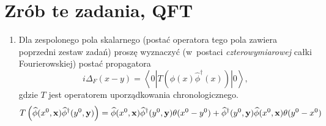 \documentclass[a4paper,11pt]{article}
\begin{document}










\section{Zrób te zadania, QFT}




\begin{enumerate}
\item Dla zespolonego pola skalarnego (postać operatora tego pola
  zawiera poprzedni zestaw zadań) proszę wyznaczyć (w~postaci
  \emph{czterowymiarowej} całki Fourierowskiej) postać propagatora
  \begin{equation}
    \label{eq:6}
    i \Delta_{ F }( x - y )
    =
    \left\langle 0 \left| T\left( \widehat{\phi}( x ) \widehat{\phi}^{ \dagger }( x )
        \right) \right| 0 \right\rangle,
  \end{equation}
  gdzie $T$ jest operatorem uporządkowania chronologicznego.
  \begin{equation}
    \label{eq:7}
    T\left( \widehat{\phi}( x^{ 0 }, \mathbf{x} )
      \widehat{\phi}^{ \dagger }( y^{ 0 }, \mathbf{y} ) \right)
    =
    \widehat{\phi}( x^{ 0 }, \mathbf{x} ) \widehat{\phi}^{ \dagger }( y^{ 0 }, \mathbf{y})
    \theta( x^{ 0 } - y^{ 0 } )
    +
    \widehat{\phi}^{ \dagger }( y^{ 0 }, \mathbf{y} ) \widehat{\phi}( x^{ 0 }, \mathbf{x} )
    \theta( y^{ 0 } - x^{ 0 } )
  \end{equation}


\end{enumerate}
\end{document}
